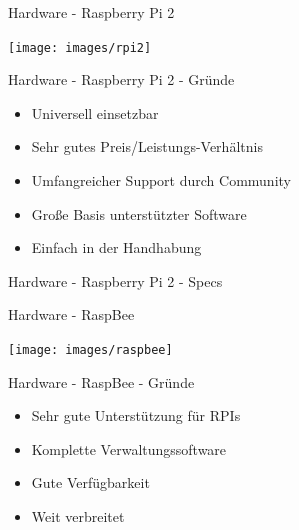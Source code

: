 \begin{frame}{Hardware - Raspberry Pi 2}
  \begin{center}
    \texttt{[image: images/rpi2]}
    \label{fig:rpi}
  \end{center}
\end{frame}

\begin{frame}{Hardware - Raspberry Pi 2 - Gründe}
  \Large
  \begin{itemize}
    \item Universell einsetzbar
    \item Sehr gutes Preis/Leistungs-Verhältnis
    \item Umfangreicher Support durch Community
    \item Große Basis unterstützter Software
    \item Einfach in der Handhabung
  \end{itemize}
\end{frame}

\begin{frame}{Hardware - Raspberry Pi 2 - Specs}
  \Large

\end{frame}

\begin{frame}{Hardware - RaspBee}
  \begin{center}
    \texttt{[image: images/raspbee]}
    \label{fig:rbee}
  \end{center}
\end{frame}

\begin{frame}{Hardware - RaspBee - Gründe}
  \Large
  \begin{itemize}
    \item Sehr gute Unterstützung für RPIs
    \item Komplette Verwaltungssoftware
    \item Gute Verfügbarkeit
    \item Weit verbreitet
  \end{itemize}
\end{frame}

